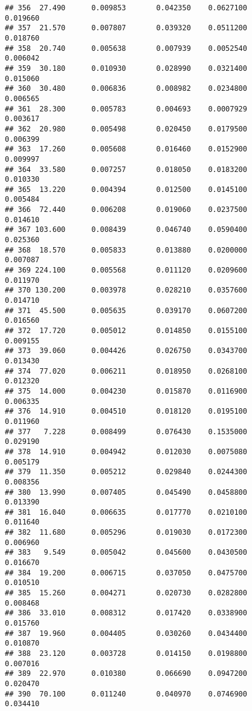 \documentclass[
]{article}
\begin{document}
\begin{verbatim}
## 356  27.490      0.009853       0.042350    0.0627100          0.019660
## 357  21.570      0.007807       0.039320    0.0511200          0.018760
## 358  20.740      0.005638       0.007939    0.0052540          0.006042
## 359  30.180      0.010930       0.028990    0.0321400          0.015060
## 360  30.480      0.006836       0.008982    0.0234800          0.006565
## 361  28.300      0.005783       0.004693    0.0007929          0.003617
## 362  20.980      0.005498       0.020450    0.0179500          0.006399
## 363  17.260      0.005608       0.016460    0.0152900          0.009997
## 364  33.580      0.007257       0.018050    0.0183200          0.010330
## 365  13.220      0.004394       0.012500    0.0145100          0.005484
## 366  72.440      0.006208       0.019060    0.0237500          0.014610
## 367 103.600      0.008439       0.046740    0.0590400          0.025360
## 368  18.570      0.005833       0.013880    0.0200000          0.007087
## 369 224.100      0.005568       0.011120    0.0209600          0.011970
## 370 130.200      0.003978       0.028210    0.0357600          0.014710
## 371  45.500      0.005635       0.039170    0.0607200          0.016560
## 372  17.720      0.005012       0.014850    0.0155100          0.009155
## 373  39.060      0.004426       0.026750    0.0343700          0.013430
## 374  77.020      0.006211       0.018950    0.0268100          0.012320
## 375  14.000      0.004230       0.015870    0.0116900          0.006335
## 376  14.910      0.004510       0.018120    0.0195100          0.011960
## 377   7.228      0.008499       0.076430    0.1535000          0.029190
## 378  14.910      0.004942       0.012030    0.0075080          0.005179
## 379  11.350      0.005212       0.029840    0.0244300          0.008356
## 380  13.990      0.007405       0.045490    0.0458800          0.013390
## 381  16.040      0.006635       0.017770    0.0210100          0.011640
## 382  11.680      0.005296       0.019030    0.0172300          0.006960
## 383   9.549      0.005042       0.045600    0.0430500          0.016670
## 384  19.200      0.006715       0.037050    0.0475700          0.010510
## 385  15.260      0.004271       0.020730    0.0282800          0.008468
## 386  33.010      0.008312       0.017420    0.0338900          0.015760
## 387  19.960      0.004405       0.030260    0.0434400          0.010870
## 388  23.120      0.003728       0.014150    0.0198800          0.007016
## 389  22.970      0.010380       0.066690    0.0947200          0.020470
## 390  70.100      0.011240       0.040970    0.0746900          0.034410

\end{verbatim}
\end{document}
